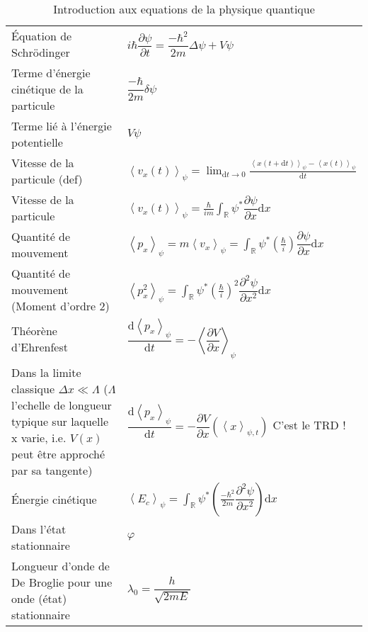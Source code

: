\documentclass[10pt,a4paper,titlepage,portrait]{article}
\renewcommand{\d}
{
    \mathrm{d}
}
\newcommand*{\dv}[2]
{
    \dfrac{\d#1}{\d#2}
}
\newcommand*{\dpv}[2]
{
    \dfrac{\partial#1}{\partial#2}
}
\newcommand*{\ddpv}[2]
{
    \dfrac{\partial^2#1}{\partial{#2}^2}
}
\newcommand{\av}[2]
{
    \left\langle#1\right\rangle_{#2}
}
\newcommand{\lap}[1]
{
    \delta#1
}
\newcommand{\rint}
{
    \int_{\mathbb{R}}
}
\begin{document}
\begin{table}[H]
\begin{tabular}{@{}p{9cm}p{10cm}@{}}
        Équation de Schrödinger & $i\hbar \dpv{\psi}{t} = \dfrac{-\hbar ^2}{2m}\Delta \psi+V\psi$ \\
        Terme d'énergie cinétique de la particule & $\dfrac{-\hbar}{2m}\lap{\psi}$ \\
        Terme lié à l'énergie potentielle & $V\psi$ \\
        Vitesse de la particule (def) & $\av{v_x(t)}{\psi} = \displaystyle\lim_{\d t \to0} \frac{\av{x(t+\d t)}{\psi} - \av{x(t)}{\psi}}{\d t}$ \\
        Vitesse de la particule & $\displaystyle \av{v_x(t)}{\psi} = \frac{\hbar}{im}\rint \psi^* \dpv{\psi}{x}\d x$ \\
        Quantité de mouvement & $\displaystyle \av{p_x}{\psi}=m\av{v_x}{\psi}=\rint \psi^* \left(\frac{\hbar}{i}\right) \dpv{\psi}{x}\d x$ \\
        Quantité de mouvement (Moment d'ordre 2) & $\displaystyle \av{p_x^2}{\psi}=\rint \psi^* \left(\frac{\hbar}{i}\right)^2 \ddpv{\psi}{x}\d x$ \\
        Théorène d'Ehrenfest & $\dv{\av{p_x}{\psi}}{t} = -\av{\dpv{V}{x}}{\psi}$ \\
        Dans la limite classique $\Delta x \ll \Lambda $ ($\Lambda$ l'echelle de longueur typique sur laquelle x varie, i.e. $V(x)$ peut être approché par sa tangente) & $\dv{\av{p_x}{\psi}}{t} = -\dpv{V}{x} \left(\av{x}{\psi, t}\right)$ C'est le TRD ! \\
        Énergie cinétique & $\displaystyle \av{E_c}{\psi} = \rint \psi^* \left(\frac{-\hbar^2}{2m}\ddpv{\psi}{x}\right) \d x $\\
        Dans l'état stationnaire & $\varphi $ \\
        Longueur d'onde de De Broglie pour une onde (état) stationnaire & $\lambda_0 = \dfrac{h}{\sqrt{2mE}}$ \\

        \bottomrule
\end{tabular}
\caption{Introduction aux equations de la physique quantique}
\label{tab:quantphis}
\end{table}
\end{document}
